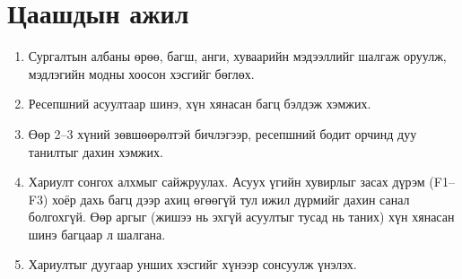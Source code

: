 \section{Цаашдын ажил}
\label{sec:future}

\begin{enumerate}
    \item Сургалтын албаны өрөө, багш, анги, хуваарийн мэдээллийг шалгаж оруулж, мэдлэгийн модны хоосон хэсгийг бөглөх.
    \item Ресепшний асуултаар шинэ, хүн хянасан багц бэлдэж хэмжих.
    \item Өөр 2--3 хүний зөвшөөрөлтэй бичлэгээр, ресепшний бодит орчинд дуу танилтыг дахин хэмжих.
    \item Хариулт сонгох алхмыг сайжруулах. Асуух үгийн хувирлыг засах дүрэм (F1--F3) хоёр дахь багц дээр ахиц өгөөгүй тул ижил дүрмийг дахин санал болгохгүй. Өөр аргыг (жишээ нь эхгүй асуултыг тусад нь таних) хүн хянасан шинэ багцаар л шалгана.
    \item Хариултыг дуугаар унших хэсгийг хүнээр сонсуулж үнэлэх.
\end{enumerate}
